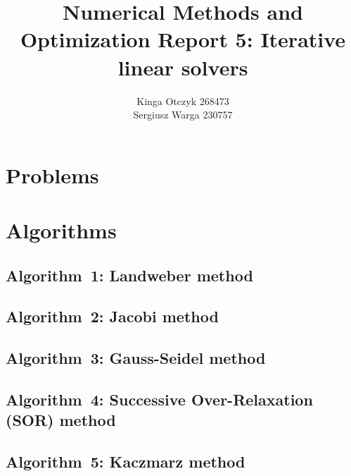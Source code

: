 \documentclass[a4paper]{article}
\title{Numerical Methods and Optimization Report 5:
Iterative linear solvers}
\author{Kinga Otczyk 268473\\Sergiusz Warga 230757}
\begin{document}
\maketitle
\tableofcontents
\listoftodos
\pagebreak

\section{Problems}



\clearpage

\section{Algorithms}%
\label{sec:algorithms}
\subsection{Algorithm~1: Landweber method}%
\label{algorithm:1}

\subsection{Algorithm~2: Jacobi method}%

% 
\subsection{Algorithm~3: Gauss-Seidel method}%
\label{algorithm:3}



% 
\subsection{Algorithm~4: Successive Over-Relaxation (SOR) method}%
\label{algorithm:4}


\subsection{Algorithm~5: Kaczmarz method}%






\clearpage

\nocite{Zdunek, GoluVanl96, Meyer}


\end{document}
